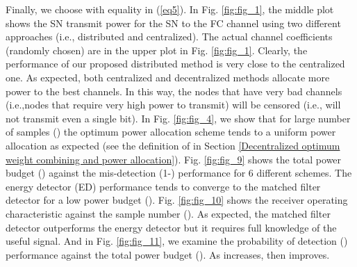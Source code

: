 \documentclass[conference]{IEEEtran}
\begin{document}
Finally, we choose  with equality in (\ref{eq5}). In Fig. \ref{fig:fig_1}, the middle plot shows  the SN transmit power   for the  SN to the FC channel using two different approaches (i.e., distributed and centralized). The actual channel coefficients (randomly chosen) are in the upper plot in Fig. \ref{fig:fig_1}. Clearly, the performance of our proposed distributed method is very close to the centralized one. As expected, both centralized and decentralized methods  allocate more power to the best channels. In this way, the nodes that have very bad channels (i.e.,nodes that require very high power to transmit) will be censored (i.e., will not transmit even a single bit). 
In Fig. \ref{fig:fig_4}, we show that for large number of samples () the optimum power allocation scheme tends to a uniform power allocation as expected (see the definition of  in Section \ref{Decentralized optimum weight combining and power allocation}). Fig. \ref{fig:fig_9} shows the total power budget () against the mis-detection (1-) performance for 6 different schemes. The energy detector (ED) performance tends to converge to the matched filter detector for a low power budget (). Fig. \ref{fig:fig_10} shows the receiver operating characteristic against the sample number (). As expected, the matched filter detector outperforms the energy detector but it requires full knowledge of the useful signal. And in Fig. \ref{fig:fig_11}, we examine the probability of detection ()  performance against the total power budget (). As  increases, then  improves. 
\end{document}
